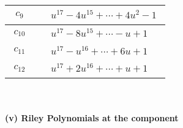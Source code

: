 \documentclass[1p]{elsarticle_modified}
\theoremstyle{definition}
\begin{document}
\begin{tabular}{m{50pt}|m{274pt}}
\hline $$\begin{aligned}c_{9}\end{aligned}$$&$\begin{aligned}
&u^{17}-4 u^{15}+\cdots+4 u^2-1
\end{aligned}$\\
\hline $$\begin{aligned}c_{10}\end{aligned}$$&$\begin{aligned}
&u^{17}-8 u^{15}+\cdots- u+1
\end{aligned}$\\
\hline $$\begin{aligned}c_{11}\end{aligned}$$&$\begin{aligned}
&u^{17}- u^{16}+\cdots+6 u+1
\end{aligned}$\\
\hline $$\begin{aligned}c_{12}\end{aligned}$$&$\begin{aligned}
&u^{17}+2 u^{16}+\cdots+u+1
\end{aligned}$\\
\hline
\end{tabular}\\~\\
\newpage\renewcommand{\arraystretch}{1}
\flushleft \textbf{(v) Riley Polynomials at the component}\newline \\
\end{document}
